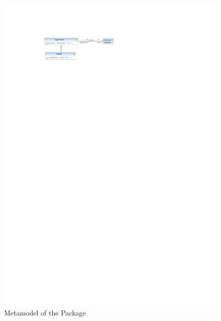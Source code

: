 %
%

\begin{figure}[htbp]
  \centering
  \includegraphics[width=\textheight,
  angle=90]{figures/A_technical-reference/packages/storydiagrams/storydiagrams}
  \caption{Metamodel of the  Package}
  \label{fig:MM:storydiagrams}
\end{figure}
